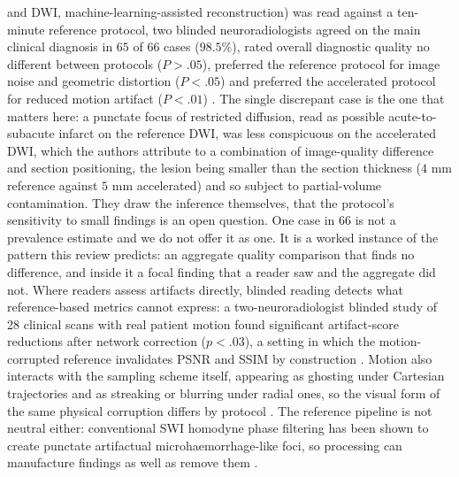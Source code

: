 \documentclass[review,authoryear]{elsarticle}
\begin{document}
and DWI, machine-learning-assisted reconstruction) was read against a ten-minute
reference protocol, two blinded neuroradiologists agreed on the main clinical diagnosis
in $65$ of $66$ cases ($98.5\%$), rated overall diagnostic quality no different between
protocols ($P>.05$), preferred the reference protocol for image noise and geometric
distortion ($P<.05$) and preferred the accelerated protocol for reduced motion artifact
($P<.01$) \citep{lang2024ultrafast}. The single discrepant case is the one that matters
here: a punctate focus of restricted diffusion, read as possible acute-to-subacute
infarct on the reference DWI, was less conspicuous on the accelerated DWI, which the
authors attribute to a combination of image-quality difference and section positioning,
the lesion being smaller than the section thickness ($4\text{ mm}$ reference against
$5\text{ mm}$ accelerated) and so subject to partial-volume contamination. They draw the
inference themselves, that the protocol's sensitivity to small findings is an open
question. One case in $66$ is not a prevalence estimate and we do not offer it as one.
It is a worked instance of the pattern this review predicts: an aggregate quality
comparison that finds no difference, and inside it a focal finding that a reader saw
and the aggregate did not. Where readers assess artifacts
directly, blinded reading detects what reference-based metrics cannot express: a
two-neuroradiologist blinded study of 28 clinical scans with real patient motion found
significant artifact-score reductions after network correction ($p<.03$), a setting in
which the motion-corrupted reference invalidates PSNR and SSIM by construction
\citep{sommer2020correction}. Motion also interacts with the sampling scheme itself,
appearing as ghosting under Cartesian trajectories and as streaking or blurring under
radial ones, so the visual form of the same physical corruption differs by
protocol \citep{schauman2026an}. The reference pipeline is not neutral either:
conventional SWI homodyne phase filtering has been shown to create punctate artifactual
microhaemorrhage-like foci, so processing can manufacture findings as well as remove
them \citep{li2015artifactual}.
\end{document}
